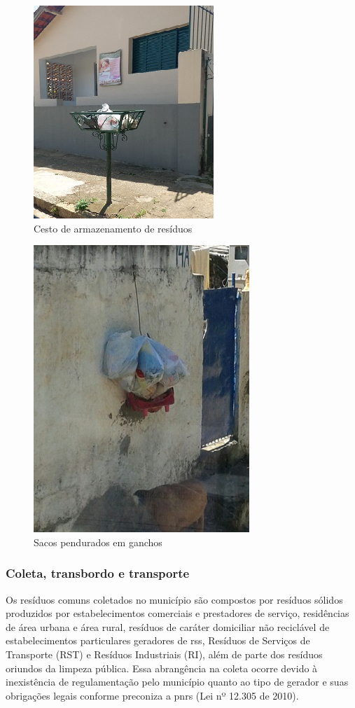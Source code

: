 \begin{figure}
	\centering
	\includegraphics[width=0.5\linewidth]{produtos/prodtres/image008}
	\caption{Cesto de armazenamento de resíduos}
	\label{fig:image008}
\end{figure}	


\begin{figure}
	\centering
	\includegraphics[width=0.5\linewidth]{produtos/prodtres/image009}
	\caption{Sacos pendurados em ganchos}
	\label{fig:image009}
\end{figure}


\subsubsection{Coleta, transbordo e transporte}

Os resíduos comuns coletados no município são compostos por resíduos sólidos produzidos por estabelecimentos comerciais e prestadores de serviço, residências de área urbana e área rural, resíduos de caráter domiciliar não reciclável de estabelecimentos particulares geradores de \gls{rss}, Resíduos de Serviços de Transporte (RST) e Resíduos Industriais (RI), além de parte dos resíduos oriundos da limpeza pública. Essa abrangência na coleta ocorre devido à inexistência de regulamentação pelo município quanto ao tipo de gerador e suas obrigações legais conforme preconiza a \gls{pnrs} (Lei nº 12.305 de 2010).

